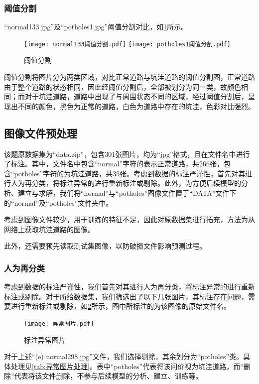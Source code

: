 \documentclass{MathorCupmodeling}
\begin{document}
	\subsubsection{阈值分割}
	“normal133.jpg”及“potholes1.jpg”阈值分割对比，如\textcolor{blue}{\cref{fig:阈值分割}}所示。
	\begin{figure}[H]
		\centering
		\texttt{[image: normal133阈值分割.pdf]}
		\hspace{0.3in}
		\texttt{[image: potholes1阈值分割.pdf]}
		\caption{阈值分割}
		\label{fig:阈值分割}
	\end{figure}
	阈值分割将图片分为两类区域，对比正常道路与坑洼道路的阈值分割图，正常道路由于整个道路的状态相同，因此经阈值分割后，全部被划分为同一类，故颜色相同；而对于坑洼道路，道路中出现了与周围状态不同的区域，经过阈值分割后，呈现出不同的颜色，黑色为正常的道路，白色为道路中存在的坑洼，色彩对比强烈。

	\subsection{图像文件预处理}\label{图像文件预处理}
	该题原数据集为“data.zip”，包含301张图片，均为“jpg”格式，且在文件名中进行了标注。其中，文件名中包含“normal”字符的表示正常道路，共266张，包含“potholes”字符的为坑洼道路，共35张。考虑到数据的标注严谨性，首先对其进行人为再分类，将标注异常的进行重新标注或剔除。此外，为方便后续模型的分析、建立与求解，我们将“normal”与“potholes”图像文件置于“DATA”文件下的“normal”及“potholes”文件夹中。

	考虑到图像文件较少，用于训练的特征不足，因此对原数据集进行拓充，方法为从网络上获取坑洼道路的图像。

	此外，还需要预先读取测试集图像，以防破损文件影响预测过程。
	\subsubsection{人为再分类}
	考虑到数据的标注严谨性，我们首先对其进行人为再分类，将标注异常的进行重新标注或剔除。对于所给数据集，我们筛选出了以下几张图片，其标注存在问题，需要进行重新标注或剔除，如\textcolor{blue}{\cref{fig:异常图片}}所示，图中所标注的为该图像的原始文件名。
	\begin{figure}[H]
		\centering
		\texttt{[image: 异常图片.pdf]}
		\caption{标注异常图片}
		\label{fig:异常图片}
	\end{figure}

	对于上述“(e) normal298.jpg”文件，我们选择剔除，其余划分为“potholes”类。具体处理见\textcolor{blue}{\cref{tab:异常图片处理}}。表中“potholes”代表将该问价视为坑洼道路，而“删除”代表将该文件删除，不参与后续模型的分析、建立、训练等。
\end{document}
